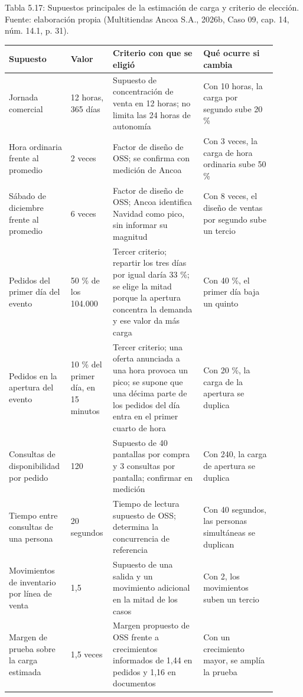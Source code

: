 \documentclass[11pt]{article}
\begin{document}
Tabla 5.17: Supuestos principales de la estimación de carga y criterio de elección. Fuente: elaboración propia (Multitiendas Ancoa S.A., 2026b, Caso 09, cap. 14, núm. 14.1, p. 31).\label{tab:t22}\par\nopagebreak
\begin{longtable}{@{}p{0.199\linewidth}p{0.115\linewidth}p{0.320\linewidth}p{0.268\linewidth}@{}}
\toprule Supuesto & Valor & Criterio con que se eligió & Qué ocurre si cambia \\
\midrule\endhead\bottomrule\endlastfoot
Jornada comercial & 12 horas, 365 días & Supuesto de concentración de venta en 12 horas; no limita las 24 horas de autonomía & Con 10 horas, la carga por segundo sube 20 \% \\
Hora ordinaria frente al promedio & 2 veces & Factor de diseño de OSS; se confirma con medición de Ancoa & Con 3 veces, la carga de hora ordinaria sube 50 \% \\
Sábado de diciembre frente al promedio & 6 veces & Factor de diseño de OSS; Ancoa identifica Navidad como pico, sin informar su magnitud & Con 8 veces, el diseño de ventas por segundo sube un tercio \\
Pedidos del primer día del evento & 50 \% de los 104.000 & Tercer criterio; repartir los tres días por igual daría 33 \%; se elige la mitad porque la apertura concentra la demanda y ese valor da más carga & Con 40 \%, el primer día baja un quinto \\
Pedidos en la apertura del evento & 10 \% del primer día, en 15 minutos & Tercer criterio; una oferta anunciada a una hora provoca un pico; se supone que una décima parte de los pedidos del día entra en el primer cuarto de hora & Con 20 \%, la carga de la apertura se duplica \\
Consultas de disponibilidad por pedido & 120 & Supuesto de 40 pantallas por compra y 3 consultas por pantalla; confirmar en medición & Con 240, la carga de apertura se duplica \\
Tiempo entre consultas de una persona & 20 segundos & Tiempo de lectura supuesto de OSS; determina la concurrencia de referencia & Con 40 segundos, las personas simultáneas se duplican \\
Movimientos de inventario por línea de venta & 1,5 & Supuesto de una salida y un movimiento adicional en la mitad de los casos & Con 2, los movimientos suben un tercio \\
Margen de prueba sobre la carga estimada & 1,5 veces & Margen propuesto de OSS frente a crecimientos informados de 1,44 en pedidos y 1,16 en documentos & Con un crecimiento mayor, se amplía la prueba \\
\end{longtable}
\end{document}

